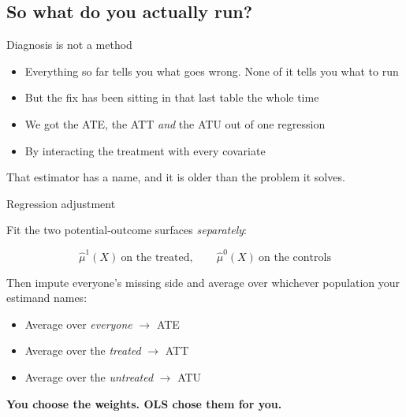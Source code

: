 \documentclass{beamer}
\newcommand{\highlight}[1]{\textcolor{accent}{\textbf{#1}}}
\newcommand{\deemph}[1]{\textcolor{warmgray}{\small #1}}
\begin{document}
\subsection{So what do you actually run?}

\begin{frame}{Diagnosis is not a method}

\begin{itemize}
\item Everything so far tells you what goes wrong. None of it tells you what to run
\item But the fix has been sitting in that last table the whole time
\item We got the ATE, the ATT \emph{and} the ATU out of one regression
\item By interacting the treatment with every covariate
\end{itemize}

\vspace{0.7em}

\deemph{That estimator has a name, and it is older than the problem it solves.}

\end{frame}


\begin{frame}{Regression adjustment}

Fit the two potential-outcome surfaces \emph{separately}:

$$\widehat{\mu}^1(X) \ \text{on the treated}, \qquad \widehat{\mu}^0(X) \ \text{on the controls}$$

Then impute everyone's missing side and average over whichever population your estimand names:

\begin{itemize}
\item Average over \emph{everyone} $\to$ ATE
\item Average over the \emph{treated} $\to$ ATT
\item Average over the \emph{untreated} $\to$ ATU
\end{itemize}

\vspace{0.5em}

\highlight{You choose the weights. OLS chose them for you.}

\end{frame}
\end{document}
